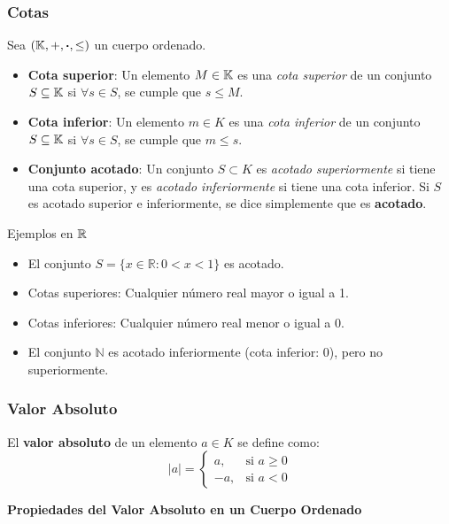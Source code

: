 \subsubsection{Cotas}

Sea $(\mathbb{K}, +, \boldsymbol{\cdot}, \leq)$ un cuerpo ordenado.

\begin{itemize}
	\item \textbf{Cota superior}: Un elemento $M \in \mathbb{K}$ es una \textit{cota superior} de un conjunto $S \subseteq \mathbb{K}$ si $\forall s \in S$, se cumple que $s \leq M$.
	\item \textbf{Cota inferior}: Un elemento $m \in K$ es una \textit{cota inferior} de un conjunto $S \subseteq \mathbb{K}$ si $\forall s \in S$, se cumple que $m \leq s$.
	\item \textbf{Conjunto acotado}: Un conjunto $S \subset K$ es \textit{acotado superiormente} si tiene una cota superior, y es \textit{acotado inferiormente} si tiene una cota inferior. Si $S$ es acotado superior e inferiormente, se dice simplemente que es \textbf{acotado}.
\end{itemize}

\begin{fmd-example}[Cotas]
	Ejemplos en $\mathbb{R}$
	\begin{itemize}
		\item El conjunto $S = \{x \in \mathbb{R} : 0 < x < 1\}$ es acotado.
		\item Cotas superiores: Cualquier número real mayor o igual a 1.
		\item Cotas inferiores: Cualquier número real menor o igual a 0.
		\item El conjunto $\mathbb{N}$ es acotado inferiormente (cota inferior: 0), pero no superiormente.
	\end{itemize}
\end{fmd-example}

\subsubsection{Valor Absoluto}

El \textbf{valor absoluto} de un elemento $a \in K$ se define como:
\[ |a| =
\begin{cases}
	a, & \text{si } a \geq 0 \\
	-a, & \text{si } a < 0
\end{cases} \]

\textbf{Propiedades del Valor Absoluto en un Cuerpo Ordenado}

